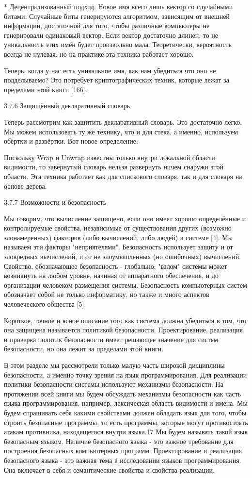 * Децентрализованный подход. Новое имя всего лишь вектор со случайными битами. Случайные биты генерируются алгоритмом, зависящим от внешней информации, достаточной для того, чтобы различные компьютеры не генерировали одинаковый вектор. Если вектор достаточно длинен, то не уникальность этих имён будет произвольно мала. Теоретически, вероятность всегда не нулевая, но на практике эта техника работает хорошо.

Теперь, когда у нас есть уникальное имя, как нам убедиться что оно не подделываемо? Это потребует криптографических техник, которые лежат за пределами этой книги [166].

3.7.6 Защищённый декларативный словарь

Теперь рассмотрим как защитить декларативный словарь. Это достаточно легко. Мы можем использовать ту же технику, что и для стека, а именно, используем обёртки и развёртки. Вот новое определение:

Поскольку Wrap и Unwrap известны только внутри локальной области видимости, то завёрнутый словарь нельзя развернуть ничем снаружи этой области. Эта техника работает как для спискового словаря, так и для словаря на основе дерева.

3.7.7 Возможности и безопасность

Мы говорим, что вычисление защищено, если оно имеет хорошо определённые и контролируемые свойства, независимые от существования других (возможно злонамеренных) факторов (либо вычислений, либо людей) в системе [4]. Мы называем эти факторы "неприятелями". Безопасность использует защиту и от зловредных вычислений, и от не злоумышленных (но ошибочных) вычислений. Свойство, обозначающее безопасность - глобально; "взлом" системы может возникнуть на любом уровне, начиная от аппаратного обеспечения, и до организации человеком размещения системы. Безопасность компьютерных систем обозначает собой не только информатику, но также и много аспектов человеческого общества [5].

Короткое, точное и ясное описание того как система должна убедиться в том, что она защищена называется политикой безопасности. Проектирование, реализация и проверка политик безопасности имеет решающее значение для систем безопасности, но она лежит за пределами этой книги.

В этом разделе мы рассмотрели только малую часть широкой дисциплины безопасности, а именно точку зрения на язык программирования. Для реализации политики безопасности системы используют механизмы безопасности. На протяжении всей книги мы будем обсуждать механизмы безопасности как часть языка программирования, например, лексическая область видимости и имена. Мы будем спрашивать себя какими свойствами должен обладать язык для того, чтобы строить безопасные программы, то есть программы, которые могут противостоять атакам противника, находящегося внутри языка.17 Мы будем называть такой язык безопасным языком. Наличие безопасного языка - это важное требование для построения безопасных компьютерных программ. Проектирование и реализация безопасного языка - это важная тема в исследовании языков программирования. Она включает в себя и семантические свойства и свойства реализации.

